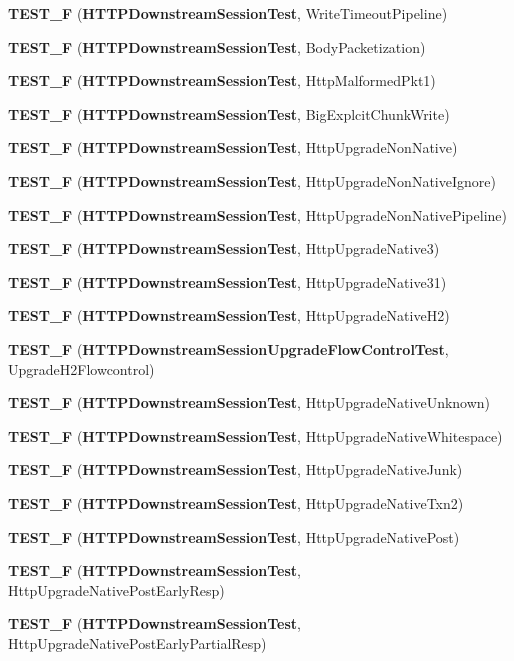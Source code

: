 \begin{DoxyCompactItemize}
{\bf T\+E\+S\+T\+\_\+F} ({\bf H\+T\+T\+P\+Downstream\+Session\+Test}, Write\+Timeout\+Pipeline)
\item 
{\bf T\+E\+S\+T\+\_\+F} ({\bf H\+T\+T\+P\+Downstream\+Session\+Test}, Body\+Packetization)
\item 
{\bf T\+E\+S\+T\+\_\+F} ({\bf H\+T\+T\+P\+Downstream\+Session\+Test}, Http\+Malformed\+Pkt1)
\item 
{\bf T\+E\+S\+T\+\_\+F} ({\bf H\+T\+T\+P\+Downstream\+Session\+Test}, Big\+Explcit\+Chunk\+Write)
\item 
{\bf T\+E\+S\+T\+\_\+F} ({\bf H\+T\+T\+P\+Downstream\+Session\+Test}, Http\+Upgrade\+Non\+Native)
\item 
{\bf T\+E\+S\+T\+\_\+F} ({\bf H\+T\+T\+P\+Downstream\+Session\+Test}, Http\+Upgrade\+Non\+Native\+Ignore)
\item 
{\bf T\+E\+S\+T\+\_\+F} ({\bf H\+T\+T\+P\+Downstream\+Session\+Test}, Http\+Upgrade\+Non\+Native\+Pipeline)
\item 
{\bf T\+E\+S\+T\+\_\+F} ({\bf H\+T\+T\+P\+Downstream\+Session\+Test}, Http\+Upgrade\+Native3)
\item 
{\bf T\+E\+S\+T\+\_\+F} ({\bf H\+T\+T\+P\+Downstream\+Session\+Test}, Http\+Upgrade\+Native31)
\item 
{\bf T\+E\+S\+T\+\_\+F} ({\bf H\+T\+T\+P\+Downstream\+Session\+Test}, Http\+Upgrade\+Native\+H2)
\item 
{\bf T\+E\+S\+T\+\_\+F} ({\bf H\+T\+T\+P\+Downstream\+Session\+Upgrade\+Flow\+Control\+Test}, Upgrade\+H2\+Flowcontrol)
\item 
{\bf T\+E\+S\+T\+\_\+F} ({\bf H\+T\+T\+P\+Downstream\+Session\+Test}, Http\+Upgrade\+Native\+Unknown)
\item 
{\bf T\+E\+S\+T\+\_\+F} ({\bf H\+T\+T\+P\+Downstream\+Session\+Test}, Http\+Upgrade\+Native\+Whitespace)
\item 
{\bf T\+E\+S\+T\+\_\+F} ({\bf H\+T\+T\+P\+Downstream\+Session\+Test}, Http\+Upgrade\+Native\+Junk)
\item 
{\bf T\+E\+S\+T\+\_\+F} ({\bf H\+T\+T\+P\+Downstream\+Session\+Test}, Http\+Upgrade\+Native\+Txn2)
\item 
{\bf T\+E\+S\+T\+\_\+F} ({\bf H\+T\+T\+P\+Downstream\+Session\+Test}, Http\+Upgrade\+Native\+Post)
\item 
{\bf T\+E\+S\+T\+\_\+F} ({\bf H\+T\+T\+P\+Downstream\+Session\+Test}, Http\+Upgrade\+Native\+Post\+Early\+Resp)
\item 
{\bf T\+E\+S\+T\+\_\+F} ({\bf H\+T\+T\+P\+Downstream\+Session\+Test}, Http\+Upgrade\+Native\+Post\+Early\+Partial\+Resp)

\end{DoxyCompactItemize}
